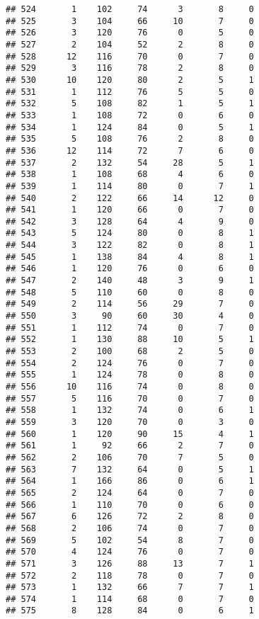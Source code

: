 \documentclass[
]{article}
\begin{document}
\begin{verbatim}
## 524       1    102     74      3       8     0
## 525       3    104     66     10       7     0
## 526       3    120     76      0       5     0
## 527       2    104     52      2       8     0
## 528      12    116     70      0       7     0
## 529       3    116     78      2       8     0
## 530      10    120     80      2       5     1
## 531       1    112     76      5       5     0
## 532       5    108     82      1       5     1
## 533       1    108     72      0       6     0
## 534       1    124     84      0       5     1
## 535       5    108     76      2       8     0
## 536      12    114     72      7       6     0
## 537       2    132     54     28       5     1
## 538       1    108     68      4       6     0
## 539       1    114     80      0       7     1
## 540       2    122     66     14      12     0
## 541       1    120     66      0       7     0
## 542       3    128     64      4       9     0
## 543       5    124     80      0       8     1
## 544       3    122     82      0       8     1
## 545       1    138     84      4       8     1
## 546       1    120     76      0       6     0
## 547       2    140     48      3       9     1
## 548       5    110     60      0       8     0
## 549       2    114     56     29       7     0
## 550       3     90     60     30       4     0
## 551       1    112     74      0       7     0
## 552       1    130     88     10       5     1
## 553       2    100     68      2       5     0
## 554       2    124     76      0       7     0
## 555       1    124     78      0       8     0
## 556      10    116     74      0       8     0
## 557       5    116     70      0       7     0
## 558       1    132     74      0       6     1
## 559       3    120     70      0       3     0
## 560       1    120     90     15       4     1
## 561       1     92     66      2       7     0
## 562       2    106     70      7       5     0
## 563       7    132     64      0       5     1
## 564       1    166     86      0       6     1
## 565       2    124     64      0       7     0
## 566       1    110     70      0       6     0
## 567       6    126     72      2       8     0
## 568       2    106     74      0       7     0
## 569       5    102     54      8       7     0
## 570       4    124     76      0       7     0
## 571       3    126     88     13       7     1
## 572       2    118     78      0       7     0
## 573       1    132     66      7       7     1
## 574       1    114     68      0       7     0
## 575       8    128     84      0       6     1

\end{verbatim}
\end{document}
